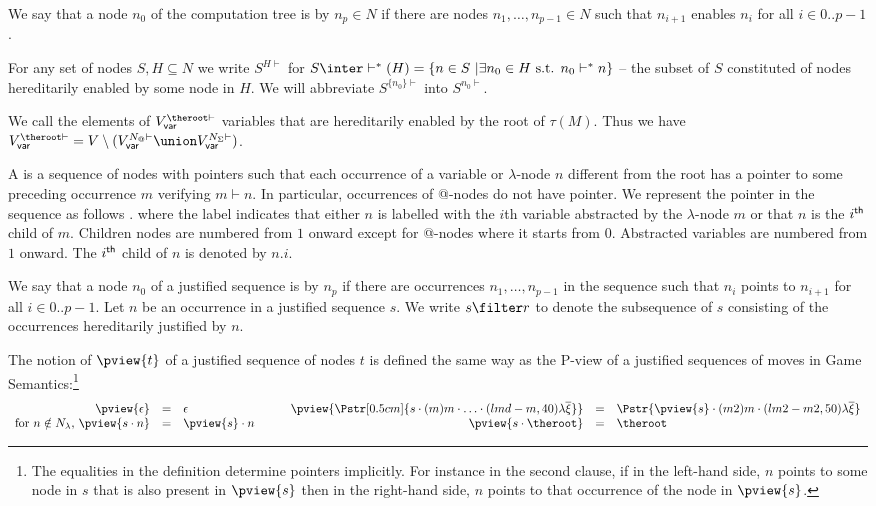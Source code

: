 We say that a node $n_0$ of the computation tree is
 by $n_p \in N$ if there are nodes
$n_1,\ldots, n_{p-1} \in N$ such that $n_{i+1}$ enables $n_{i}$ for all $i\in 0..p-1$.

For any set of nodes $S, H \subseteq N$ we write $S^{H\vdash}$ for $S \inter \vdash^*(H) = \{ n \in S \ | \exists n_0 \in H \mbox{ s.t. }n_0  \vdash^* n \}$ -- the subset of $S$ constituted of nodes hereditarily enabled by some node in $H$. We will abbreviate $S^{\{n_0\}\vdash}$ into $S^{n_0\vdash}$.

We call  the elements of $V_{\sf var}^{\theroot\vdash}$ \ie variables that are hereditarily enabled by the root of $\tau(M)$. Thus we have $V_{\sf var}^{\theroot\vdash} = V \setminus ( V_{\sf var}^{N_@\vdash} \union V_{\sf var}^{N_\Sigma\vdash})$.

A  is a sequence of nodes with pointers such that each occurrence of a variable or $\lambda$-node $n$ different from the root has a pointer to some preceding occurrence $m$ verifying $m \vdash n$. In particular, occurrences of @-nodes do not have pointer. We represent the pointer in the sequence as follows .
 where the label indicates that either $n$ is labelled with the $i$th variable
abstracted by the $\lambda$-node $m$ or that $n$ is the $i^{\sf th}$ child of $m$.  Children nodes are numbered from $1$ onward except for @-nodes where it starts from $0$. Abstracted variables are numbered from $1$ onward. The $i^{\sf th}$ child of $n$ is denoted by $n.i$.

We say that a node $n_0$ of a justified sequence is
 by $n_p$ if there are occurrences $n_1,
\ldots, n_{p-1}$ in the sequence such that $n_i$ points to $n_{i+1}$ for all $i\in 0..p-1$. Let $n$ be an occurrence in a justified sequence $s$. We write $s \filter r$ to denote the subsequence of $s$ consisting of the occurrences hereditarily justified by $n$.


The notion of  $\pview{t}$ of a justified sequence of nodes $t$ is defined the same way as the P-view of a justified sequences of moves in Game Semantics:\footnote{ The equalities in the
  definition determine pointers implicitly. For instance in the second
  clause, if in the left-hand side, $n$ points to some node in $s$
  that is also present in $\pview{s}$ then in the right-hand side, $n$
  points to that occurrence of the node in $\pview{s}$.}
$$\begin{array}{rclrcl}
\pview{\epsilon} &=&  \epsilon & \pview{\Pstr[0.5cm]{ s \cdot (m) m \cdot \ldots \cdot (lmd-m,40){\lambda\overline{\xi}} }}
 &=& \Pstr{
\pview{s} \cdot (m2) m \cdot (lm2-m2,50) {\lambda \overline{\xi}} } \\
\mbox{for $n \notin N_\lambda$, } \pview{s \cdot n }  &=&  \pview{s} \cdot n \qquad & \pview{s \cdot \theroot }  &=&  \theroot
\end{array}$$


